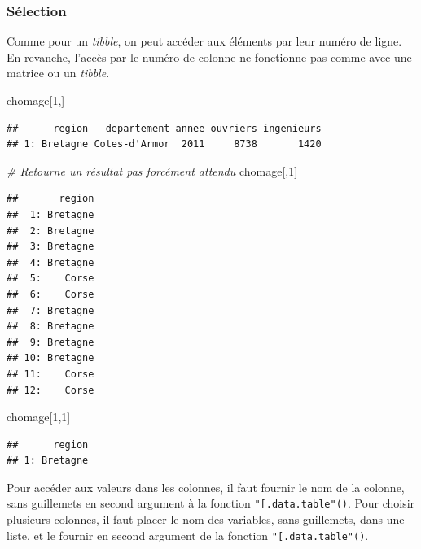 \documentclass[
  11pt,
]{book}
\newenvironment{Shaded}{\begin{snugshade}}{\end{snugshade}}
\newcommand{\CommentTok}[1]{\textcolor[rgb]{0.56,0.35,0.01}{\textit{#1}}}
\newcommand{\DecValTok}[1]{\textcolor[rgb]{0.00,0.00,0.81}{#1}}
\newcommand{\NormalTok}[1]{#1}
\numberwithin{equation}{section}
\numberwithin{countremarque}{section}
\begin{document}
\hypertarget{suxe9lection-1}{%
\subsubsection{Sélection}\label{suxe9lection-1}}

Comme pour un \emph{tibble}, on peut accéder aux éléments par leur numéro de ligne. En revanche, l'accès par le numéro de colonne ne fonctionne pas comme avec une matrice ou un \emph{tibble}.

\begin{Shaded}
\begin{Highlighting}[]
\NormalTok{chomage[}\DecValTok{1}\NormalTok{,]}
\end{Highlighting}
\end{Shaded}

\begin{lstlisting}
##      region   departement annee ouvriers ingenieurs
## 1: Bretagne Cotes-d'Armor  2011     8738       1420
\end{lstlisting}

\begin{Shaded}
\begin{Highlighting}[]
\CommentTok{\# Retourne un résultat pas forcément attendu}
\NormalTok{chomage[,}\DecValTok{1}\NormalTok{]}
\end{Highlighting}
\end{Shaded}

\begin{lstlisting}
##       region
##  1: Bretagne
##  2: Bretagne
##  3: Bretagne
##  4: Bretagne
##  5:    Corse
##  6:    Corse
##  7: Bretagne
##  8: Bretagne
##  9: Bretagne
## 10: Bretagne
## 11:    Corse
## 12:    Corse
\end{lstlisting}

\begin{Shaded}
\begin{Highlighting}[]
\NormalTok{chomage[}\DecValTok{1}\NormalTok{,}\DecValTok{1}\NormalTok{]}
\end{Highlighting}
\end{Shaded}

\begin{lstlisting}
##      region
## 1: Bretagne
\end{lstlisting}

Pour accéder aux valeurs dans les colonnes, il faut fournir le nom de la colonne, sans guillemets en second argument à la fonction \texttt{"{[}.data.table"()}. Pour choisir plusieurs colonnes, il faut placer le nom des variables, sans guillemets, dans une liste, et le fournir en second argument de la fonction \texttt{"{[}.data.table"()}.
\end{document}
